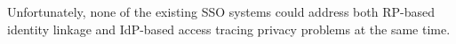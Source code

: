 Unfortunately, %
none of the existing SSO systems could address both RP-based identity linkage and IdP-based access tracing privacy problems at the same time.
